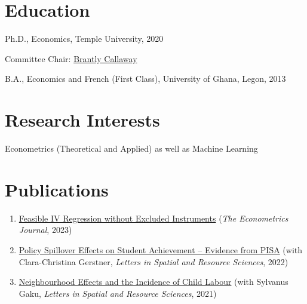 \documentclass[12pt,letterpaper]{article}
\renewenvironment{itemize}{
  \begin{list}{}{
    \setlength{\leftmargin}{1.5em}
  }
}{
  \end{list}
}
\begin{document}
\section*{Education}

\begin{itemize}
  \item Ph.D., Economics, Temple University, 2020
  \begin{itemize}
    \item Committee Chair:   \href{https://bcallaway11.github.io/index.html}{Brantly Callaway}
  \end{itemize}

  \item B.A., Economics and French (First Class), University of Ghana, Legon, 2013
\end{itemize}

\section*{Research Interests}
\begin{itemize}
  \item Econometrics (Theoretical and Applied) as well as Machine Learning
\end{itemize}

\section*{Publications}
\begin{enumerate}
  \item \href{https://academic.oup.com/ectj/advance-article-abstract/doi/10.1093/ectj/utac032/6888009?redirectedFrom=fulltext}{Feasible IV Regression without Excluded Instruments} (\textit{The Econometrics Journal}, 2023)
  
  \item \href{https://link.springer.com/article/10.1007/s12076-022-00310-y}{Policy Spillover Effects on Student Achievement – Evidence from PISA} (with Clara-Christina Gerstner, \textit{Letters in Spatial and Resource Sciences}, 2022) 
  
	\item \href{https://link.springer.com/article/10.1007/s12076-021-00276-3}{Neighbourhood Effects and the Incidence of Child Labour} (with Sylvanus Gaku, \textit{Letters in Spatial and Resource Sciences}, 2021)
\end{enumerate}
\end{document}
